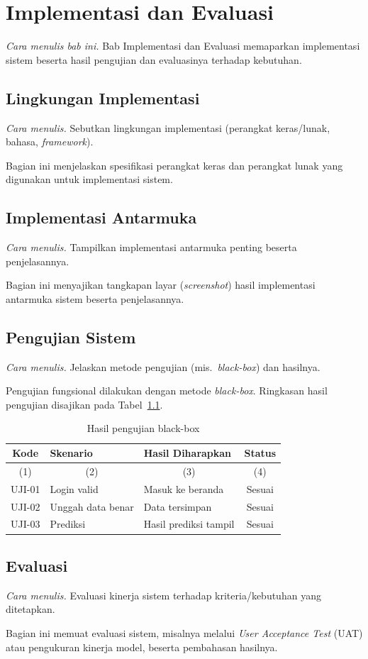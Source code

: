 \chapter{Implementasi dan Evaluasi}
\emph{Cara menulis bab ini.} Bab Implementasi dan Evaluasi memaparkan implementasi sistem beserta hasil pengujian dan evaluasinya terhadap kebutuhan.


\section{Lingkungan Implementasi}
\emph{Cara menulis.} Sebutkan lingkungan implementasi (perangkat keras/lunak, bahasa, \emph{framework}).

Bagian ini menjelaskan spesifikasi perangkat keras dan perangkat lunak yang
digunakan untuk implementasi sistem.

\section{Implementasi Antarmuka}
\emph{Cara menulis.} Tampilkan implementasi antarmuka penting beserta penjelasannya.

Bagian ini menyajikan tangkapan layar (\emph{screenshot}) hasil implementasi
antarmuka sistem beserta penjelasannya.

\section{Pengujian Sistem}
\emph{Cara menulis.} Jelaskan metode pengujian (mis.\ \emph{black-box}) dan hasilnya.

Pengujian fungsional dilakukan dengan metode \emph{black-box}. Ringkasan hasil
pengujian disajikan pada Tabel~\ref{tab:blackbox}.

\begin{table}[H]
\centering
\caption{Hasil pengujian black-box}
\label{tab:blackbox}
\begin{tabular}{|c|l|l|c|}
\hline
\textbf{Kode} & \textbf{Skenario} & \textbf{Hasil Diharapkan} & \textbf{Status} \\ \hline
\multicolumn{1}{|c|}{(1)} & \multicolumn{1}{c|}{(2)} & \multicolumn{1}{c|}{(3)} & \multicolumn{1}{c|}{(4)} \\ \hline
UJI-01 & Login valid       & Masuk ke beranda          & Sesuai \\
UJI-02 & Unggah data benar & Data tersimpan            & Sesuai \\
UJI-03 & Prediksi          & Hasil prediksi tampil     & Sesuai \\ \hline
\end{tabular}
\end{table}

\section{Evaluasi}
\emph{Cara menulis.} Evaluasi kinerja sistem terhadap kriteria/kebutuhan yang ditetapkan.

Bagian ini memuat evaluasi sistem, misalnya melalui \emph{User Acceptance Test}
(UAT) atau pengukuran kinerja model, beserta pembahasan hasilnya.
